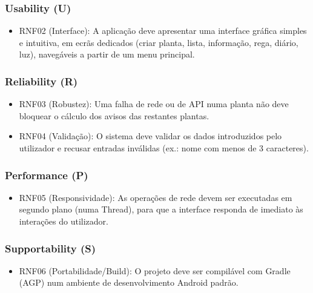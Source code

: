\documentclass[runningheads,a4paper]{llncs}
\begin{document}
\subsubsection{Usability (U)}
\begin{itemize}
    \item RNF02 (Interface): A aplicação deve apresentar uma interface
        gráfica simples e intuitiva, em ecrãs dedicados (criar planta, lista,
        informação, rega, diário, luz), navegáveis a partir de um menu principal.
\end{itemize}

\subsubsection{Reliability (R)}
\begin{itemize}
    \item RNF03 (Robustez): Uma falha de rede ou de API numa planta não
        deve bloquear o cálculo dos avisos das restantes plantas.
    \item RNF04 (Validação): O sistema deve validar os dados introduzidos
        pelo utilizador e recusar entradas inválidas (ex.: nome com menos de 3
        caracteres).
\end{itemize}

\subsubsection{Performance (P)}
\begin{itemize}
    \item RNF05 (Responsividade): As operações de rede devem ser executadas
        em segundo plano (numa Thread), para que a interface responda de
        imediato às interações do utilizador.
\end{itemize}

\subsubsection{Supportability (S)}
\begin{itemize}
    \item RNF06 (Portabilidade/Build): O projeto deve ser compilável com
        Gradle (AGP) num ambiente de desenvolvimento Android padrão.
\end{itemize}
\end{document}
